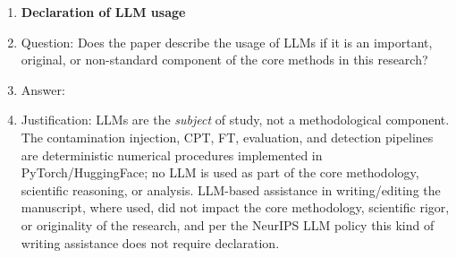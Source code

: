 \begin{enumerate}
\item {\bf Declaration of LLM usage}
    \item[] Question: Does the paper describe the usage of LLMs if it is an important, original, or non-standard component of the core methods in this research?
    \item[] Answer: \answerNA{}
    \item[] Justification: LLMs are the \emph{subject} of study, not a methodological component. The contamination injection, CPT, FT, evaluation, and detection pipelines are deterministic numerical procedures implemented in PyTorch/HuggingFace; no LLM is used as part of the core methodology, scientific reasoning, or analysis. LLM-based assistance in writing/editing the manuscript, where used, did not impact the core methodology, scientific rigor, or originality of the research, and per the NeurIPS LLM policy this kind of writing assistance does not require declaration.

\end{enumerate}
